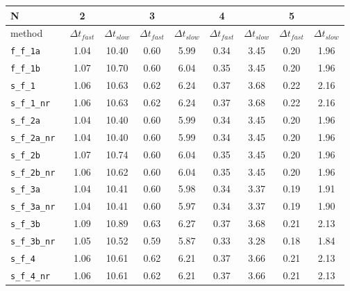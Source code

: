 \begin{tabular}{l|cc|cc|cc|cc}
N& 2  &  & 3  &  & 4  &  & 5  &  \\
\hline
method& $\Delta t_{fast}$  & $\Delta t_{slow}$& $\Delta t_{fast}$  & $\Delta t_{slow}$& $\Delta t_{fast}$  & $\Delta t_{slow}$& $\Delta t_{fast}$  & $\Delta t_{slow}$\\
\hline
\verb|f_f_1a | & 1.04 & 10.40 & 0.60 & 5.99 & 0.34 & 3.45 & 0.20 & 1.96 \\
\verb|f_f_1b | & 1.07 & 10.70 & 0.60 & 6.04 & 0.35 & 3.45 & 0.20 & 1.96 \\
\verb|s_f_1 | & 1.06 & 10.63 & 0.62 & 6.24 & 0.37 & 3.68 & 0.22 & 2.16 \\
\verb|s_f_1_nr | & 1.06 & 10.63 & 0.62 & 6.24 & 0.37 & 3.68 & 0.22 & 2.16 \\
\verb|s_f_2a | & 1.04 & 10.40 & 0.60 & 5.99 & 0.34 & 3.45 & 0.20 & 1.96 \\
\verb|s_f_2a_nr | & 1.04 & 10.40 & 0.60 & 5.99 & 0.34 & 3.45 & 0.20 & 1.96 \\
\verb|s_f_2b | & 1.07 & 10.74 & 0.60 & 6.04 & 0.35 & 3.45 & 0.20 & 1.96 \\
\verb|s_f_2b_nr | & 1.06 & 10.62 & 0.60 & 6.04 & 0.35 & 3.45 & 0.20 & 1.96 \\
\verb|s_f_3a | & 1.04 & 10.41 & 0.60 & 5.98 & 0.34 & 3.37 & 0.19 & 1.91 \\
\verb|s_f_3a_nr | & 1.04 & 10.41 & 0.60 & 5.97 & 0.34 & 3.37 & 0.19 & 1.90 \\
\verb|s_f_3b | & 1.09 & 10.89 & 0.63 & 6.27 & 0.37 & 3.68 & 0.21 & 2.13 \\
\verb|s_f_3b_nr | & 1.05 & 10.52 & 0.59 & 5.87 & 0.33 & 3.28 & 0.18 & 1.84 \\
\verb|s_f_4 | & 1.06 & 10.61 & 0.62 & 6.21 & 0.37 & 3.66 & 0.21 & 2.13 \\
\verb|s_f_4_nr | & 1.06 & 10.61 & 0.62 & 6.21 & 0.37 & 3.66 & 0.21 & 2.13 \\
\hline
\end{tabular}
